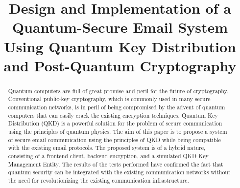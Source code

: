 \documentclass[conference]{IEEEtran}
\begin{document}
\title{Design and Implementation of a Quantum-Secure Email System Using Quantum Key Distribution and Post-Quantum Cryptography\\
}

\author{
\and
{}
\and
{}
\and
{}
}

\maketitle

\begin{abstract}
Quantum computers are full of great promise and peril for the future of cryptography. Conventional public-key cryptography, which is commonly used in many secure communication networks, is in peril of being compromised by the advent of quantum computers that can easily crack the existing encryption techniques. Quantum Key Distribution (QKD) is a powerful solution for the problem of secure communication using the principles of quantum physics. The aim of this paper is to propose a system of secure email communication using the principles of QKD while being compatible with the existing email protocols. The proposed system is of a hybrid nature, consisting of a frontend client, backend encryption, and a simulated QKD Key Management Entity. The results of the tests performed have confirmed the fact that quantum security can be integrated with the existing communication networks without the need for revolutionizing the existing communication infrastructure.
\end{abstract}
\end{document}
